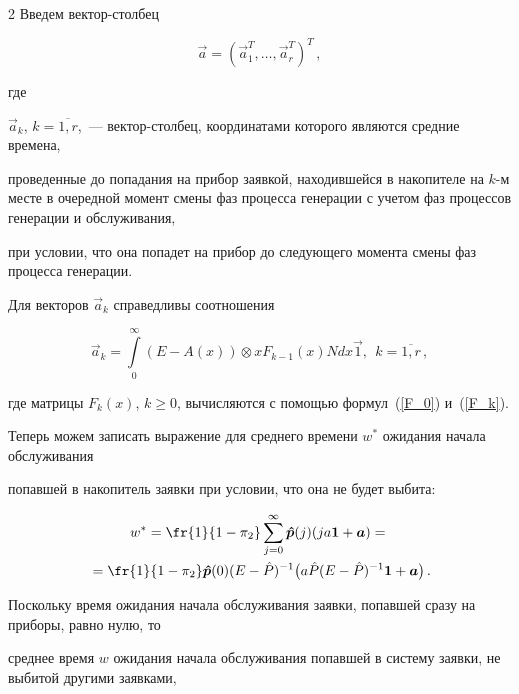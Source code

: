 \begin{multicols}{2}
Введем вектор-столбец 


$$


\vec{a}=(\vec{a}_1^T,\ldots,\vec{a}_r^T)^T\,,


$$ 


где


$\vec{a}_k$, $k=\overline{1,r}$,~--- вектор-столбец, координатами которого являются средние времена,


проведенные до попадания на прибор заявкой, находившейся в накопителе на $k$-м месте в очередной момент смены фаз процесса генерации с учетом фаз процессов генерации и обслуживания,


при условии, что она попадет на прибор до следующего момента смены фаз процесса генерации.


Для векторов $\vec{a}_k$ справедливы соотношения


$$


\vec{a}_k=\int\limits_{0}^{\infty} (E-A(x))\otimes xF_{k-1}(x) N dx \vec{1}, \ \ k=\overline{1,r}\,,


$$


где матрицы $F_k(x)$, $k\ge 0$, вычисляются с помощью формул~(\ref{F_0}) и~(\ref{F_k}).





Теперь можем записать выражение для среднего времени $w^*$ ожидания начала обслуживания


попавшей в накопитель заявки при условии, что она не будет выбита:





\noindent


\begin{multline*}


w^*=\fr{1}{1-\pi_2}\sum\limits_{j=0}^{\infty} \vec{\hat p}(j) (ja{\bf 1}+\vec{a})={}\\


{}=


\fr{1}{1-\pi_2}\vec{\hat p}(0)(E-\hat P)^{-1} \bigl( a\hat P(E-\hat P)^{-1}{\bf 1}+ \vec{a}\bigr)\,.


\end{multline*}





Поскольку время ожидания начала обслуживания заявки, попавшей сразу на приборы, равно нулю, то


среднее время $w$ ожидания начала обслуживания попавшей в систему заявки, не выбитой другими заявками,



\end{multicols}
